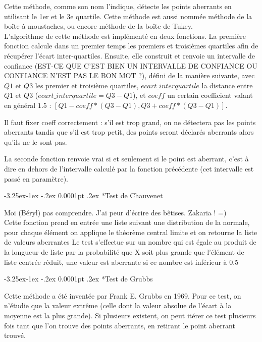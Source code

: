 \documentclass[a4paper,12pt]{article} %
\makeatletter
\renewcommand\subparagraph{\@startsection{subparagraph}{5}{\z@}%
                                      {-3.25ex\@plus -1ex \@minus -.2ex}%
                                      {0.0001pt \@plus .2ex}%
                                      {\normalfont\normalsize\bfseries}}
\makeatother
\begin{document}
                       Cette méthode, comme son nom l'indique, détecte les points aberrants en utilisant le 1er et le 3e quartile. Cette méthode est aussi nommée méthode de la boîte à moustaches, ou encore méthode de la boîte de Tukey. \\
                       
                       L'algorithme de cette méthode est implémenté en deux fonctions. La première fonction calcule dans un premier temps les premiers et troisièmes quartiles afin de récupérer l'écart inter-quartiles. Ensuite, elle construit et renvoie un intervalle de confiance (EST-CE QUE C'EST BIEN UN INTERVALLE DE CONFIANCE OU CONFIANCE N'EST PAS LE BON MOT ?), défini de la manière suivante, avec $Q1$ et $Q3$ les premier et troisième quartiles, $ecart\_interquartile$ la distance entre $Q1$ et $Q3$ ($ecart\_interquartile = Q3 - Q1$), et $coeff$ un certain coefficient valant en général $1.5$ : $[Q1 - coeff*(Q3 - Q1), Q3 +coeff*(Q3 - Q1 )]$.
                       
                       Il faut fixer coeff correctement : s'il est trop grand, on ne détectera pas les points aberrants tandis que s'il est trop petit, des points seront déclarés aberrants alors qu'ils ne le sont pas.
                       
                       La seconde fonction renvoie vrai si et seulement si le point est aberrant, c'est à dire en dehors de l'intervalle calculé par la fonction précédente (cet intervalle est passé en paramètre).
                       

					\subparagraph*{Test de Chauvenet}
					
					   Moi (Béryl) pas comprendre. J'ai peur d'écrire des bêtises. Zakaria ! =) \\
					   
					   Cette fonction prend en entrée une liste suivant une distribution de la normale, pour chaque élément on applique le théorème central limite et on retourne la liste de valeurs aberrantes Le test s’eﬀectue sur un nombre qui est égale au produit de la longueur de liste par la probabilité que X soit plus grande que l’élément de liste centrée réduit, une valeur est aberrante si ce nombre est inférieur à 0.5
					   
					\subparagraph*{Test de Grubbs}
                        					
                        Cette méthode a été inventée par Frank E. Grubbs en 1969. Pour ce test, on n’étudie que la valeur extrême (celle dont la valeur absolue de l’écart à la moyenne est la plus grande). Si plusieurs existent, on peut itérer ce test plusieurs fois tant que l'on trouve des points aberrants, en retirant le point aberrant trouvé. \\
                        
\end{document}
